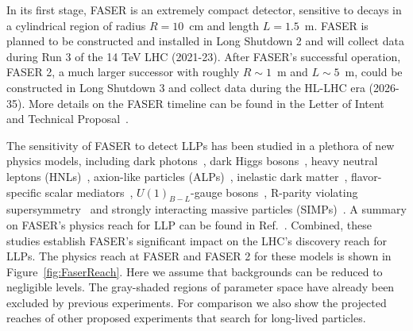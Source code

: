 
In its first stage, FASER is an extremely compact detector, sensitive to decays in a cylindrical region of radius $R=10$~cm and length $L= 1.5$~m. FASER is planned to be constructed and installed in Long Shutdown 2 and will collect data during Run 3 of the 14 TeV LHC (2021-23). After FASER's successful operation, FASER 2, a much larger successor with roughly $R\sim1$~m and $L\sim5$~m, could be constructed in Long Shutdown 3 and collect data during the HL-LHC era (2026-35). More details on the FASER timeline can be found in the Letter of Intent~\cite{Ariga:2018zuc} and Technical Proposal~\cite{Ariga:2018pin}.
 
The sensitivity of FASER to detect LLPs has been studied in a plethora of new physics models, including dark photons~\cite{Feng:2017uoz}, dark Higgs bosons~\cite{Feng:2017vli}, heavy neutral leptons (HNLs)~\cite{Kling:2018wct}, axion-like particles (ALPs)~\cite{Feng:2018pew}, inelastic dark matter~\cite{Berlin:2018jbm},
flavor-specific scalar mediators~\cite{Batell:2017kty}, $U(1)_{B-L}$-gauge bosons~\cite{Bauer:2018onh}, R-parity violating supersymmetry~\cite{Helo:2018qej,Dercks:2018eua} and strongly interacting massive particles (SIMPs)~\cite{Hochberg:2018rjs}. A summary on FASER's physics reach for LLP can be found in Ref.~\cite{Ariga:2018uku}. Combined, these studies establish FASER's significant impact on the LHC's discovery reach for LLPs. The physics reach at FASER and FASER 2 for these models is shown in Figure~\ref{fig:FaserReach}. Here we assume that backgrounds can be reduced to negligible levels. The gray-shaded regions of parameter space have already been excluded by previous experiments. For comparison we also show the projected reaches of other proposed experiments that search for long-lived particles.

